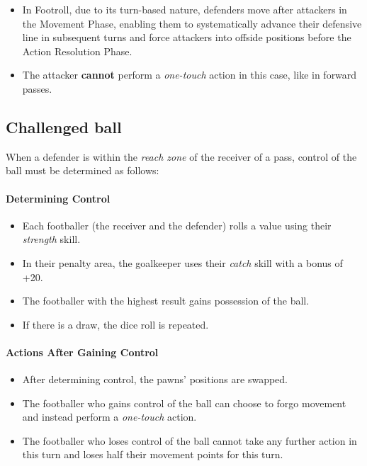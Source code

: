 \documentclass[12pt]{article}
\begin{document}
\begin{note}
\begin{itemize}
\item In Footroll, due to its turn-based nature, defenders move after attackers in the Movement Phase, enabling them to systematically advance their defensive line in subsequent turns and force attackers into offside positions before the Action Resolution Phase.
\item The attacker \textbf{cannot} perform a \emph{one-touch} action in this case, like in forward passes.
\end{itemize}
\end{note}

\subsection{\textbf{Challenged ball}}

When a defender is within the \emph{reach zone} of the receiver of a pass, control of the ball must be determined as follows:

\paragraph{Determining Control}

\begin{rulebox}
\begin{itemize}
\item Each footballer (the receiver and the defender) rolls a value using their \emph{strength} skill.
\item In their penalty area, the goalkeeper uses their \emph{catch} skill with a bonus of +20.
\item The footballer with the highest result gains possession of the ball.
\item If there is a draw, the dice roll is repeated.
\end{itemize}
\end{rulebox}

\paragraph{Actions After Gaining Control}

\begin{rulebox}
\begin{itemize}
\item After determining control, the pawns' positions are swapped.
\item The footballer who gains control of the ball can choose to forgo movement and instead perform a \emph{one-touch} action.
\item The footballer who loses control of the ball cannot take any further action in this turn and loses half their movement points for this turn.
\end{itemize}
\end{rulebox}
\end{document}
